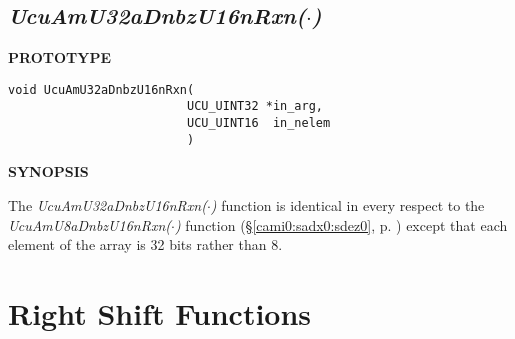 \subsection[\emph{UcuAmU32aDnbzU16nRxn(\protect\mbox{\protect$\cdot$})}]
           {\emph{UcuAmU32aDnbzU16nRxn(\protect\mbox{\protect\boldmath $\cdot$})}}
\label{cami0:sadx0:sdez2}

%

\noindent\textbf{PROTOTYPE}
\begin {list}{}{\setlength{\leftmargin}{0.25in}\setlength{\topsep}{0.0in}}
\item
\begin{verbatim}
void UcuAmU32aDnbzU16nRxn(
                         UCU_UINT32 *in_arg,
                         UCU_UINT16  in_nelem
                         )
\end{verbatim}
\end{list}
\vspace{2.8ex}

\noindent\textbf{SYNOPSIS}
\begin{list}{}{\setlength{\leftmargin}{0.25in}\setlength{\topsep}{0.0in}}
\item The \emph{UcuAmU32aDnbzU16nRxn($\cdot$)} function is identical in every
      respect to the \emph{UcuAmU8aDnbzU16nRxn($\cdot$)} function
      (\S{}\ref{cami0:sadx0:sdez0}, p. \pageref{cami0:sadx0:sdez0})
      except that each element of the array is 32 bits
      rather than 8.
\end{list}
\vspace{2.8ex}


\section{Right Shift Functions}
\label{cami0:srsf0}



